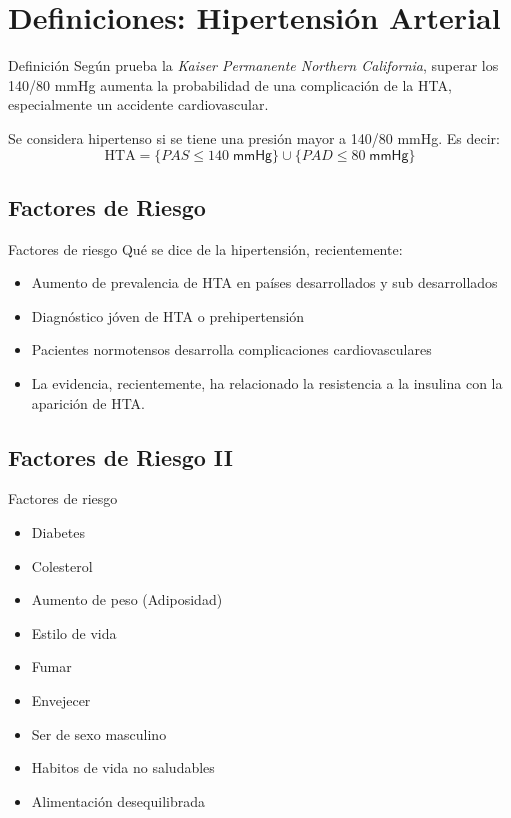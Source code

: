\documentclass[aspectratio=169]{beamer}
\newcommand{\pro}{\item [$\blacktriangleright$]}
\begin{document}
\section{Definiciones: Hipertensión Arterial}
\begin{frame}{Definición}
Según prueba la \textit{Kaiser Permanente Northern California}, superar los 140/80 mmHg aumenta la probabilidad de una complicación de la HTA, especialmente un accidente cardiovascular.
\vspace{3mm}
\small
    \begin{definition}
        Se considera hipertenso si se tiene una presión mayor a 140/80 mmHg.
        \vfill
        Es decir:        
        $$ \textrm{HTA} = \{PAS \leq 140 \; \textsf{mmHg} \} \cup \{PAD \leq 80 \; \textsf{mmHg} \} $$
    
    \vfill
    
    \end{definition}
\end{frame}

\subsection*{Factores de Riesgo}
\begin{frame}{Factores de riesgo}
Qué se dice de la hipertensión, recientemente:
    \begin{itemize}
        \pro Aumento de prevalencia de HTA en países desarrollados y sub desarrollados
        \pro Diagnóstico jóven de HTA o prehipertensión
        \pro Pacientes normotensos desarrolla complicaciones cardiovasculares
        \item La evidencia, recientemente, ha relacionado la resistencia a la insulina con la aparición de HTA.
    \end{itemize}
\end{frame}

\subsection*{Factores de Riesgo II}
\begin{frame}{Factores de riesgo}
    \begin{itemize}
        \pro Diabetes
        \pro Colesterol
        \pro Aumento de peso (Adiposidad)
        \pro Estilo de vida
        \pro Fumar
        \pro Envejecer 
        \pro Ser de sexo masculino
        \pro Habitos de vida no saludables
        \pro Alimentación desequilibrada
    \end{itemize}
\end{frame}
\end{document}
